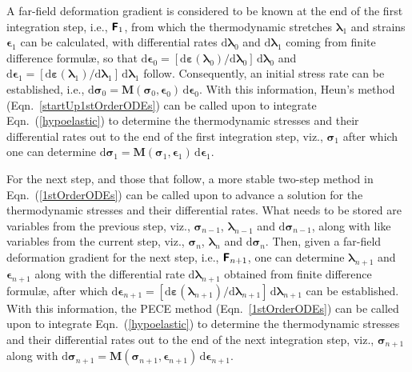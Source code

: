A far-field deformation gradient is considered to be known at the end of the first integration step, i.e., $\boldsymbol{\mathsf{F}}_1$, from which the thermo\-dynamic stretches $\boldsymbol{\lambda}_1$ and strains $\boldsymbol{\epsilon}_1$ can be calculated, with differential rates $\mathrm{d} \boldsymbol{\lambda}_0$ and $\mathrm{d} \boldsymbol{\lambda}_1$ coming from finite difference formul\ae, so that $\mathrm{d} \boldsymbol{\epsilon}_0 = [ \mathrm{d} \boldsymbol{\varepsilon} ( \boldsymbol{\lambda}_0 ) / \mathrm{d} \boldsymbol{\lambda}_0 ] \, \mathrm{d} \boldsymbol{\lambda}_0$ and $\mathrm{d} \boldsymbol{\epsilon}_1 = [ \mathrm{d} \boldsymbol{\varepsilon} ( \boldsymbol{\lambda}_1 ) / \mathrm{d} \boldsymbol{\lambda}_1 ] \, \mathrm{d} \boldsymbol{\lambda}_1$ follow.  Consequently, an initial stress rate can be established, i.e., $\mathrm{d} \boldsymbol{\sigma}_0 = \mathbf{M} ( \boldsymbol{\sigma}_0 , \boldsymbol{\epsilon}_0 ) \, \mathrm{d} \boldsymbol{\epsilon}_0$.  With this information, Heun's method (Eqn.~\ref{startUp1stOrderODEs}) can be called upon to integrate Eqn.~(\ref{hypoelastic}) to determine the thermo\-dynamic stresses and their differential rates out to the end of the first integration step, viz., $\boldsymbol{\sigma}_1$ after which one can determine $\mathrm{d} \boldsymbol{\sigma}_1 = \mathbf{M} ( \boldsymbol{\sigma}_1 , \boldsymbol{\epsilon}_1 ) \, \mathrm{d} \boldsymbol{\epsilon}_1$.    

For the next step, and those that follow, a more stable two-step method in Eqn.~(\ref{1stOrderODEs}) can be called upon to advance a solution for the thermo\-dynamic stresses and their differential rates.  What needs to be stored are variables from the previous step, viz., $\boldsymbol{\sigma}_{n-1}$, $\boldsymbol{\lambda}_{n-1}$ and $\mathrm{d} \boldsymbol{\sigma}_{n-1}$, along with like variables from the current step, viz.,  $\boldsymbol{\sigma}_n$, $\boldsymbol{\lambda}_n$ and $\mathrm{d} \boldsymbol{\sigma}_n$.  Then, given a far-field deformation gradient for the next step, i.e., $\boldsymbol{\mathsf{F}}_{n+1}$, one can determine $\boldsymbol{\lambda}_{n+1}$ and $\boldsymbol{\epsilon}_{n+1}$ along with the differential rate $\mathrm{d} \boldsymbol{\lambda}_{n+1}$ obtained from finite difference formul\ae, after which $\mathrm{d} \boldsymbol{\epsilon}_{n+1} = [ \mathrm{d} \boldsymbol{\varepsilon} ( \boldsymbol{\lambda}_{n+1} ) / \mathrm{d} \boldsymbol{\lambda}_{n+1} ] \, \mathrm{d} \boldsymbol{\lambda}_{n+1}$ can be established.  With this information, the PECE method (Eqn.~\ref{1stOrderODEs}) can be called upon to integrate Eqn.~(\ref{hypoelastic}) to determine the thermo\-dynamic stresses and their differential rates out to the end of the next integration step, viz., $\boldsymbol{\sigma}_{n+1}$ along with $\mathrm{d} \boldsymbol{\sigma}_{n+1} = \mathbf{M} ( \boldsymbol{\sigma}_{n+1} , \boldsymbol{\epsilon}_{n+1} ) \, \mathrm{d} \boldsymbol{\epsilon}_{n+1}$.

